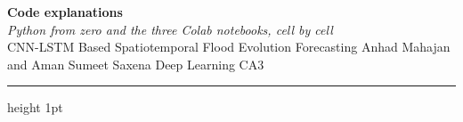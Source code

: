 \documentclass[9pt,a4paper]{extarticle}
\begin{document}
\begin{center}
{\fontsize{20}{24}\selectfont\bfseries\color{maroon} Code explanations}\\[2pt]
{\normalsize\itshape Python from zero and the three Colab notebooks, cell by cell}\\[2pt]
{\footnotesize CNN-LSTM Based Spatiotemporal Flood Evolution Forecasting \textperiodcentered{} Anhad Mahajan and Aman Sumeet Saxena \textperiodcentered{} Deep Learning CA3}
\end{center}
{\color{maroon}\hrule height 1pt}\vspace{3pt}
\setcounter{section}{0}





\end{document}
